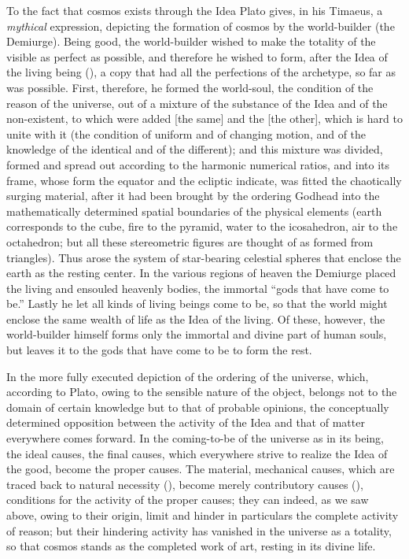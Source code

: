 To the fact that cosmos exists through the Idea Plato gives, in his Timaeus, a
\emph{mythical} expression, depicting the formation of cosmos by the world-builder (the
Demiurge). Being good, the world-builder wished to make the totality of the visible as
perfect as possible, and therefore he wished to form, after the Idea of the living being
(), a copy that had all the perfections of the archetype,
so far as was possible. First, therefore, he formed the world-soul, the condition of the
reason of the universe, out of a mixture of the substance of the Idea and of the
non-existent, to which were added  [the same] and the  [the other],
which is hard to unite with it (the condition of uniform and of changing motion, and of the
knowledge of the identical and of the different); and this mixture was divided, formed and
spread out according to the harmonic numerical ratios, and into its frame, whose form the
equator and the ecliptic indicate, was fitted the chaotically surging material, after it
had been brought by the ordering Godhead into the mathematically determined spatial
boundaries of the physical elements (earth corresponds to the cube, fire to the pyramid,
water to the icosahedron, air to the octahedron; but all these stereometric figures are
thought of as formed from triangles). Thus arose the system of star-bearing celestial
spheres that enclose the earth as the resting center. In the various regions of heaven the
Demiurge placed the living and ensouled heavenly bodies, the immortal ``gods that have come
to be.'' Lastly he let all kinds of living beings come to be, so that the world might
enclose the same wealth of life as the Idea of the living. Of these, however, the
world-builder himself forms only the immortal and divine part of human souls, but leaves it
to the gods that have come to be to form the rest.

In the more fully executed depiction of the ordering of the universe, which, according to
Plato, owing to the sensible nature of the object, belongs not to the domain of certain
knowledge but to that of probable opinions, the conceptually determined opposition between
the activity of the Idea and that of matter everywhere comes forward. In the coming-to-be
of the universe as in its being, the ideal causes, the final causes, which everywhere
strive to realize the Idea of the good, become the proper causes. The material, mechanical
causes, which are traced back to natural necessity (), become merely contributory
causes (), conditions for the activity of the proper causes; they can indeed,
as we saw above, owing to their origin, limit and hinder in particulars the complete
activity of reason; but their hindering activity has vanished in the universe as
a totality, so that cosmos stands as the completed work of art, resting in its divine life.

